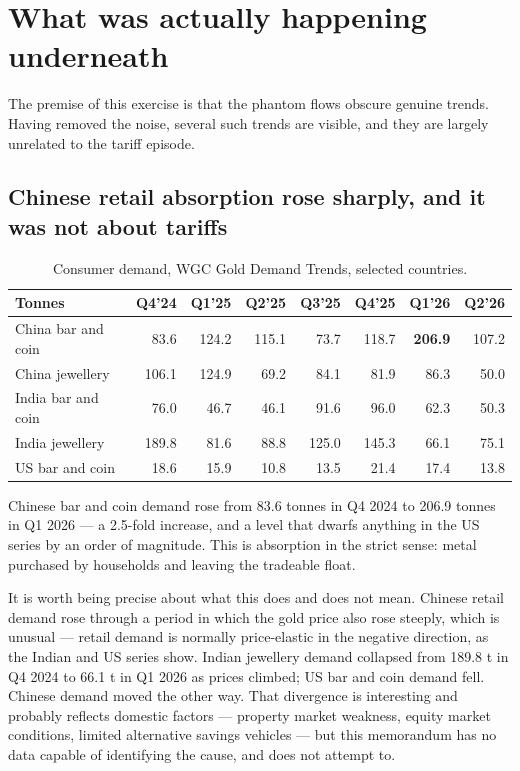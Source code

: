 \documentclass[11pt,a4paper]{article}
\begin{document}
\section{What was actually happening underneath}
\label{sec:trends}

The premise of this exercise is that the phantom flows obscure genuine trends. Having removed
the noise, several such trends are visible, and they are largely unrelated to the tariff
episode.

\subsection{Chinese retail absorption rose sharply, and it was not about tariffs}

\begin{table}[h]
\centering
\begin{tabular}{@{}lrrrrrrr@{}}
\toprule
\textbf{Tonnes} & \textbf{Q4'24} & \textbf{Q1'25} & \textbf{Q2'25} & \textbf{Q3'25} &
\textbf{Q4'25} & \textbf{Q1'26} & \textbf{Q2'26} \\
\midrule
China bar and coin & 83.6 & 124.2 & 115.1 & 73.7 & 118.7 & \textbf{206.9} & 107.2 \\
China jewellery & 106.1 & 124.9 & 69.2 & 84.1 & 81.9 & 86.3 & 50.0 \\
India bar and coin & 76.0 & 46.7 & 46.1 & 91.6 & 96.0 & 62.3 & 50.3 \\
India jewellery & 189.8 & 81.6 & 88.8 & 125.0 & 145.3 & 66.1 & 75.1 \\
US bar and coin & 18.6 & 15.9 & 10.8 & 13.5 & 21.4 & 17.4 & 13.8 \\
\bottomrule
\end{tabular}
\caption{Consumer demand, WGC Gold Demand Trends, selected countries.}
\end{table}

Chinese bar and coin demand rose from 83.6 tonnes in Q4 2024 to 206.9 tonnes in Q1 2026 --- a
2.5-fold increase, and a level that dwarfs anything in the US series by an order of magnitude.
This is absorption in the strict sense: metal purchased by households and leaving the tradeable
float.

It is worth being precise about what this does and does not mean. Chinese retail demand rose
through a period in which the gold price also rose steeply, which is unusual --- retail demand
is normally price-elastic in the negative direction, as the Indian and US series show. Indian
jewellery demand collapsed from 189.8 t in Q4 2024 to 66.1 t in Q1 2026 as prices climbed;
US bar and coin demand fell. Chinese demand moved the other way. That divergence is
interesting and probably reflects domestic factors --- property market weakness, equity market
conditions, limited alternative savings vehicles --- but this memorandum has no data capable of
identifying the cause, and does not attempt to.
\end{document}
